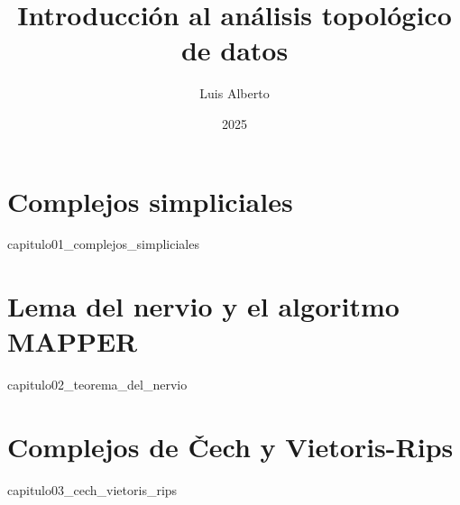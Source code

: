 \documentclass[12pt,oneside]{book}
\theoremstyle{definition}
\begin{document}
\author{Luis Alberto}
\title{Introducción al análisis topológico de datos}
\date{2025}

\frontmatter
\maketitle
\tableofcontents

\mainmatter
\chapter{Complejos simpliciales}
\label{ch:simplicial_complexes}
{capitulo01_complejos_simpliciales}

\chapter{Lema del nervio y el algoritmo MAPPER}
\label{ch:nerve_thm}
{capitulo02_teorema_del_nervio}

\chapter{Complejos de \v{C}ech y Vietoris-Rips}
\label{ch:nerve_thm}
{capitulo03_cech_vietoris_rips}

\backmatter


\end{document}

